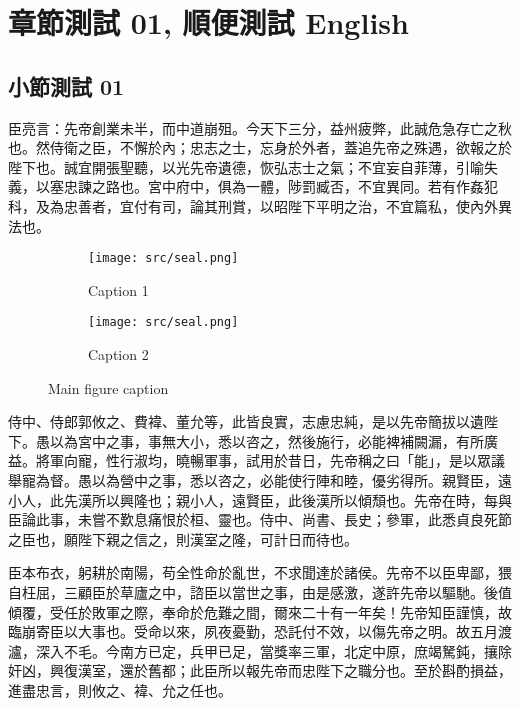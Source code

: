 \fontsize{12}{18}\selectfont
\chapter{章節測試 01, 順便測試 English}
    \section{小節測試 01}
臣亮言：先帝創業未半，而中道崩殂。今天下三分，益州疲弊，此誠危急存亡之秋也。然侍衛之臣，不懈於內；忠志之士，忘身於外者，蓋追先帝之殊遇，欲報之於陛下也。誠宜開張聖聽，以光先帝遺德，恢弘志士之氣；不宜妄自菲薄，引喻失義，以塞忠諫之路也。宮中府中，俱為一體，陟罰臧否，不宜異同。若有作姦犯科，及為忠善者，宜付有司，論其刑賞，以昭陛下平明之治，不宜篇私，使內外異法也。\par

\begin{figure}  
    \centering
    \begin{subfigure}[t]{1in}
        \centering
        \texttt{[image: src/seal.png]}
        \caption{Caption 1}\label{fig:1a}       
    \end{subfigure}
    \quad
    \begin{subfigure}[t]{1in}
        \centering
        \texttt{[image: src/seal.png]}
        \caption{Caption 2}\label{fig:1b}
    \end{subfigure}
    \caption{Main figure caption}\label{fig:1}
\end{figure}

侍中、侍郎郭攸之、費褘、董允等，此皆良實，志慮忠純，是以先帝簡拔以遺陛下。愚以為宮中之事，事無大小，悉以咨之，然後施行，必能裨補闕漏，有所廣益。將軍向寵，性行淑均，曉暢軍事，試用於昔日，先帝稱之曰「能」，是以眾議舉寵為督。愚以為營中之事，悉以咨之，必能使行陣和睦，優劣得所。親賢臣，遠小人，此先漢所以興隆也；親小人，遠賢臣，此後漢所以傾頹也。先帝在時，每與臣論此事，未嘗不歎息痛恨於桓、靈也。侍中、尚書、長史；參軍，此悉貞良死節之臣也，願陛下親之信之，則漢室之隆，可計日而待也。

臣本布衣，躬耕於南陽，苟全性命於亂世，不求聞達於諸侯。先帝不以臣卑鄙，猥自枉屈，三顧臣於草廬之中，諮臣以當世之事，由是感激，遂許先帝以驅馳。後值傾覆，受任於敗軍之際，奉命於危難之間，爾來二十有一年矣！先帝知臣謹慎，故臨崩寄臣以大事也。受命以來，夙夜憂勤，恐託付不效，以傷先帝之明。故五月渡瀘，深入不毛。今南方已定，兵甲已足，當獎率三軍，北定中原，庶竭駑鈍，攘除奸凶，興復漢室，還於舊都；此臣所以報先帝而忠陛下之職分也。至於斟酌損益，進盡忠言，則攸之、褘、允之任也。

